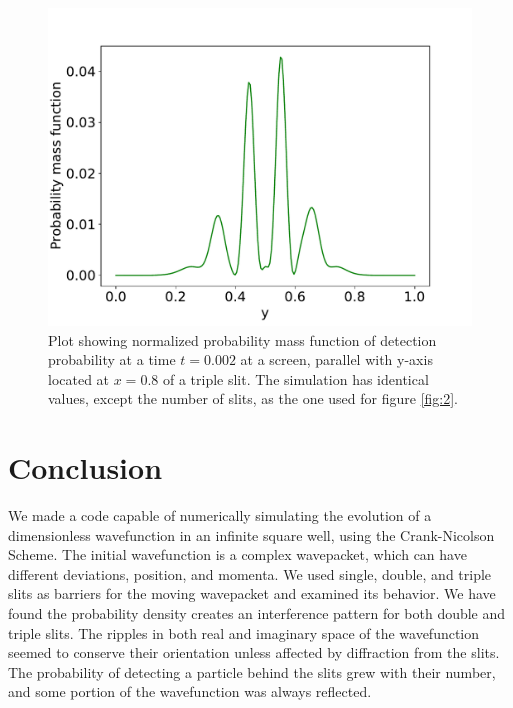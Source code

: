 \documentclass[english,notitlepage,reprint,nofootinbib]{revtex4-1}  %
\begin{document}
\begin{figure}[h!]
    \centering %
    \includegraphics[scale=0.35]{figures/1D_3.pdf} %
    \caption{Plot showing normalized probability mass function of detection probability at a time $t=0.002$ at a screen, parallel with y-axis located at $x=0.8$ of a triple slit. The simulation has identical values, except the number of slits, as the one used for figure \ref{fig:2}.}
    \label{fig:13}
\end{figure}
\FloatBarrier






\section{Conclusion}\label{sec:conclusion}

We made a code capable of numerically simulating the evolution of a dimensionless wavefunction in an infinite square well, using the Crank-Nicolson Scheme. The initial wavefunction is a complex wavepacket, which can have different deviations, position, and momenta. We used single, double, and triple slits as barriers for the moving wavepacket and examined its behavior. We have found the probability density creates an interference pattern for both double and triple slits. The ripples in both real and imaginary space of the wavefunction seemed to conserve their orientation unless affected by diffraction from the slits. The probability of detecting a particle behind the slits grew with their number, and some portion of the wavefunction was always reflected.
\end{document}
